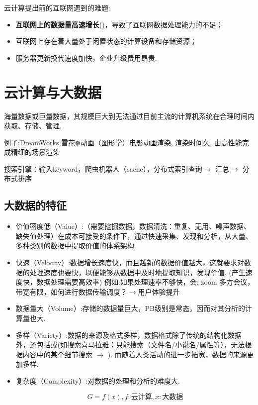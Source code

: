 云计算提出前的互联网遇到的难题:
\begin{itemize}
    \item \textbf{互联网上的数据量高速增长}()，导致了互联网数据处理能力的不足；
    \item 互联网上存在着大量处于闲置状态的计算设备和存储资源；
    \item 服务器更新换代速度加快，企业升级费用昂贵. 
\end{itemize}

\section{云计算与大数据}

\begin{definition}
    海量数据或巨量数据，其规模巨大到无法通过目前主流的计算机系统在合理时间内获取、存储、管理.
\end{definition}

例子:DreamWorks 雪花❄️动画（图形学）电影动画渲染, 渲染时间久, 由高性能完成精细的场景渲染

搜索引擎：输入keyword，爬虫机器人（cache），分布式索引查询$\rightarrow$ 汇总$\rightarrow$ 分布式排序

\subsection{大数据的特征}

\begin{itemize}
    \item 价值密度低（Value）:（需要挖掘数据，数据清洗：重复、无用、噪声数据、缺失值处理）在成本可接受的条件下，通过快速采集、发现和分析，从大量、多种类别的数据中提取价值的体系架构. 

    \item 快速（Velocity）:数据增长速度快，而且越新的数据价值越大，这就要求对数据的处理速度也要快，以便能够从数据中及时地提取知识，发现价值. (产生速度快，数据处理需要高效率) 例如:如果处理速率不够快，会; zoom 多方会议，带宽有限，如何进行数据传输调度？$\rightarrow$用户体验提升

    \item 数据量大（Volume）:存储的数据量巨大，PB级别是常态，因而对其分析的计算量也大. 

    \item  多样（Variety）:数据的来源及格式多样，数据格式除了传统的结构化数据外，还包括或(如搜索喜马拉雅：只能搜索（文件名/小说名/属性等），无法根据内容中的某个细节搜索 $\rightarrow$ ). 而随着人类活动的进一步拓宽，数据的来源更加多样. 

   \item 复杂度（Complexity）:对数据的处理和分析的难度大. 

   $$G=f(x), f:\text{云计算}, x:\text{大数据}$$
\end{itemize}



